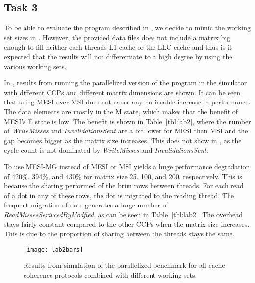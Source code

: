 \subsection{Task 3}
To be able to evaluate the program described in , we decide to mimic the working set sizes in . However, the provided data files does not include a matrix big enough to fill neither each threads L1 cache or the LLC cache and thus is it expected that the results will not differentiate to a high degree by using the various working sets. 

In , results from running the parallelized version of the program in the simulator with different CCPs and different matrix dimensions are shown. It can be seen that using MESI over MSI does not cause any noticeable increase in performance. The data elements are mostly in the M state, which makes that the benefit of MESI's E state is low. The benefit is shown in Table~\ref{tbl:lab2}, where the number of \textit{WriteMisses} and \textit{InvalidationsSent} are a bit lower for MESI than MSI and the gap becomes bigger as the matrix size increases. This does not show in , as the cycle count is not dominated by \textit{WriteMisses} and \textit{InvalidationsSent}.

To use MESI-MG instead of MESI or MSI yields a huge performance degradation of 420\%, 394\%, and 430\% for matrix size 25, 100, and 200, respectively. This is because the sharing performed of the brim rows between threads. For each read of a dot in any of these rows, the dot is migrated to the reading thread. The frequent migration of dots generates a large number of \textit{ReadMissesSerivcedByModfied}, as can be seen in Table~\ref{tbl:lab2}. The overhead stays fairly constant compared to the other CCPs when the matrix size increases. This is due to the proportion of sharing between the threads stays the same.  

\begin{figure}[t]
	\center
	\texttt{[image: lab2bars]}
	\caption{Results from simulation of the parallelized benchmark for all cache coherence protocols combined with different working sets.}
	\label{fig:lab2}
\end{figure}

